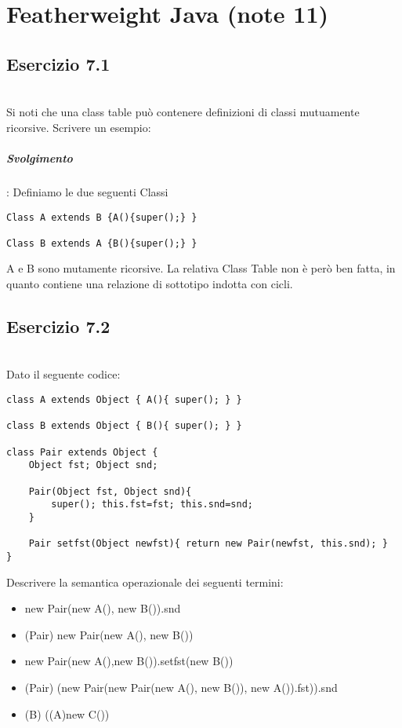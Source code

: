 \section{Featherweight Java (note 11)} 
\subsection*{Esercizio 7.1}\
\\ 
Si noti che una class table pu\`o contenere definizioni di classi mutuamente ricorsive.
\linebreak Scrivere un esempio:


\vspace{0,5cm}
\noindent
\subparagraph{Svolgimento}:
Definiamo le due seguenti Classi

\begin{lstlisting}
Class A extends B {A(){super();} }

Class B extends A {B(){super();} }

\end{lstlisting}

\noindent
A e B sono mutamente ricorsive. La relativa Class Table non \`e per\`o ben fatta, in quanto contiene una relazione di sottotipo indotta con cicli.

\vspace{1cm}
\subsection*{Esercizio 7.2}\
\\ 
Dato il seguente codice:
\begin{lstlisting}
class A extends Object { A(){ super(); } }

class B extends Object { B(){ super(); } }

class Pair extends Object { 
	Object fst; Object snd;
	
	Pair(Object fst, Object snd){
		super(); this.fst=fst; this.snd=snd; 
	} 
	
	Pair setfst(Object newfst){ return new Pair(newfst, this.snd); }
}

\end{lstlisting}

\vspace{0,5cm}
Descrivere la semantica operazionale dei seguenti termini:

\begin{itemize}
\item new Pair(new A(), new B()).snd
\item (Pair) new Pair(new A(), new B())
\item new Pair(new A(),new B()).setfst(new B())
\item (Pair) (new Pair(new Pair(new A(), new B()), new A()).fst)).snd
\item (B) ((A)new C())
\end{itemize}

